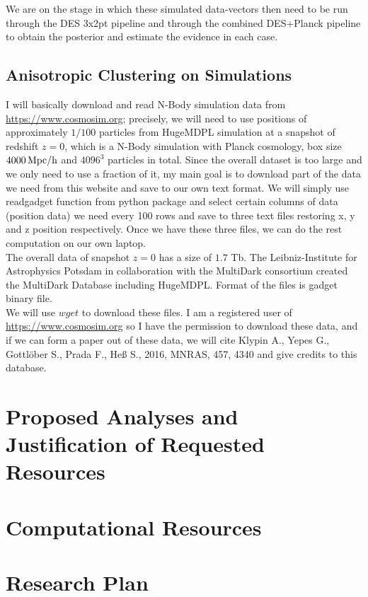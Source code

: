 \documentclass[12pt]{article}
\begin{document}
\begin{small}
We are on the stage in which these simulated data-vectors then need to be run through the DES 3x2pt pipeline and through the combined DES+Planck pipeline to obtain the posterior and estimate the evidence in each case. 

\subsection{Anisotropic Clustering on Simulations}
I will basically download and read N-Body simulation data from \url{https://www.cosmosim.org}; precisely, we will need to use positions of approximately $1/100$ particles from HugeMDPL simulation at a snapshot of redshift $z=0$, which is a N-Body simulation with Planck cosmology, box size $4000 \, \rm  Mpc/h$ and $4096^3$ particles in total. Since the overall dataset is too large and we only need to use a fraction of it, my main goal is to download part of the data we need from this website and save to our own text format. We will simply use readgadget function from python package and select certain columns of data (position data) we need every 100 rows and save to three text files restoring x, y and z position respectively. Once we have these three files, we can do the rest computation on our own laptop.\\
The overall data of snapshot $z=0$ has a size of $1.7$ Tb. The Leibniz-Institute for Astrophysics Potsdam in collaboration with the MultiDark consortium created the MultiDark Database including HugeMDPL. Format of the files is gadget binary file. \\
We will use $wget$ to download these files. I am a registered user of \url{https://www.cosmosim.org} so I have the permission to download these data, and if we can form a paper out of these data, we will cite Klypin A., Yepes G., Gottl{\"o}ber S., Prada F., He{\ss} S., 2016, MNRAS, 457, 4340 and give credits to this database.


\section{Proposed Analyses and Justification of Requested Resources}

\section{Computational Resources}

\section{Research Plan}


\end{small}
\end{document}
